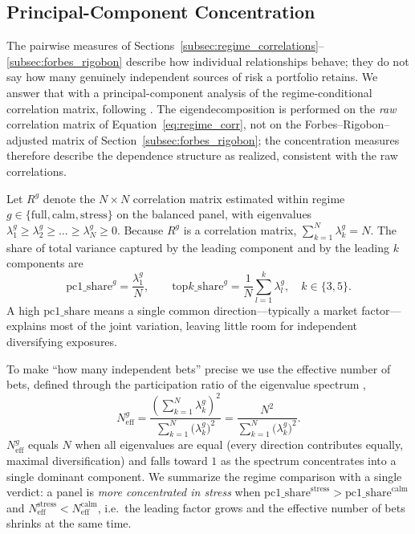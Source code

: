 \subsection{Principal-Component Concentration}
\label{subsec:pca_concentration}

The pairwise measures of Sections~\ref{subsec:regime_correlations}--\ref{subsec:forbes_rigobon} describe how individual relationships behave; they do not say how many genuinely independent sources of risk a portfolio retains. We answer that with a principal-component analysis of the regime-conditional correlation matrix, following \citet{jolliffe2002pca}. The eigendecomposition is performed on the \emph{raw} correlation matrix of Equation~\eqref{eq:regime_corr}, not on the Forbes--Rigobon--adjusted matrix of Section~\ref{subsec:forbes_rigobon}; the concentration measures therefore describe the dependence structure as realized, consistent with the raw correlations.

Let $R^{g}$ denote the $N \times N$ correlation matrix estimated within regime $g \in \{\mathrm{full}, \mathrm{calm}, \mathrm{stress}\}$ on the balanced panel, with eigenvalues $\lambda^{g}_1 \ge \lambda^{g}_2 \ge \dots \ge \lambda^{g}_N \ge 0$. Because $R^{g}$ is a correlation matrix, $\sum_{k=1}^{N} \lambda^{g}_k = N$. The share of total variance captured by the leading component and by the leading $k$ components are
\begin{equation}
\mathrm{pc1\_share}^{g} = \frac{\lambda^{g}_1}{N},
\qquad
\mathrm{top}k\text{\_}\mathrm{share}^{g} = \frac{1}{N}\sum_{l=1}^{k} \lambda^{g}_l,
\quad k \in \{3,5\}.
\label{eq:pc_shares}
\end{equation}
A high $\mathrm{pc1\_share}$ means a single common direction---typically a market factor---explains most of the joint variation, leaving little room for independent diversifying exposures.

To make ``how many independent bets'' precise we use the effective number of bets, defined through the participation ratio of the eigenvalue spectrum \citep{meucci2009},
\begin{equation}
N_{\mathrm{eff}}^{g}
= \frac{\left(\sum_{k=1}^{N} \lambda^{g}_k\right)^{2}}{\sum_{k=1}^{N} \big(\lambda^{g}_k\big)^{2}}
= \frac{N^{2}}{\sum_{k=1}^{N} \big(\lambda^{g}_k\big)^{2}}.
\label{eq:effective_bets}
\end{equation}
$N_{\mathrm{eff}}^{g}$ equals $N$ when all eigenvalues are equal (every direction contributes equally, maximal diversification) and falls toward $1$ as the spectrum concentrates into a single dominant component. We summarize the regime comparison with a single verdict: a panel is \emph{more concentrated in stress} when $\mathrm{pc1\_share}^{\mathrm{stress}} > \mathrm{pc1\_share}^{\mathrm{calm}}$ and $N_{\mathrm{eff}}^{\mathrm{stress}} < N_{\mathrm{eff}}^{\mathrm{calm}}$, i.e.\ the leading factor grows and the effective number of bets shrinks at the same time.

